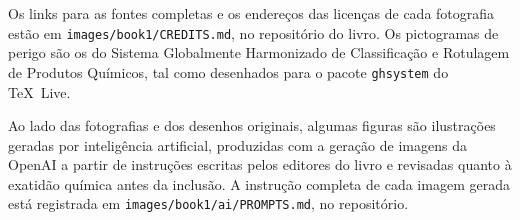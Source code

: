 Os links para as fontes completas e os endereços das licenças de cada
fotografia estão em \texttt{images/book1/CREDITS.md}, no repositório do
livro. Os pictogramas de perigo são os do Sistema Globalmente
Harmonizado de Classificação e Rotulagem de Produtos Químicos, tal como
desenhados para o pacote \texttt{ghsystem} do \TeX\ Live.

\bigskip
Ao lado das fotografias e dos desenhos originais, algumas figuras são
ilustrações geradas por inteligência artificial, produzidas com a
geração de imagens da OpenAI a partir de instruções escritas pelos
editores do livro e revisadas quanto à exatidão química antes da
inclusão. A instrução completa de cada imagem gerada está registrada em
\texttt{images/book1/ai/PROMPTS.md}, no repositório.
\clearpage

